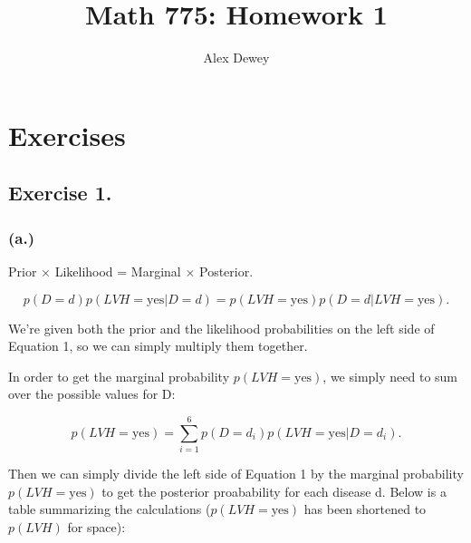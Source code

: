 \documentclass{article}
\begin{document}
\title{Math 775: Homework 1}
\author{Alex Dewey}


\maketitle


\section{Exercises}

\subsection{Exercise 1.}
\subsubsection{(a.)}

Prior \(\times\) Likelihood = Marginal \(\times\) Posterior.

\begin{equation}
p(D=d)p(LVH=\text{yes} \vert D=d) = p(LVH=\text{yes})p(D=d \vert LVH=\text{yes}).
\end{equation}

We're given both the prior and the likelihood probabilities
on the left side of Equation 1, so we can simply multiply them together.

In order to get the marginal probability \(p(LVH = \text{yes})\), we simply need
to sum over the possible values for D:

\begin{equation}
p(LVH = \text{yes}) = \sum^{6}_{i=1} p(D = d_i)p(LVH = \text{yes} \vert D=d_i).
\end{equation}

Then we can simply divide the left side of Equation 1 by the marginal probability \(p(LVH=\text{yes})\) to get the
posterior proabability for each disease d. Below is a table summarizing the calculations (\(p(LVH=\text{yes})\) has
been shortened to \(p(LVH)\) for space):
\end{document}
